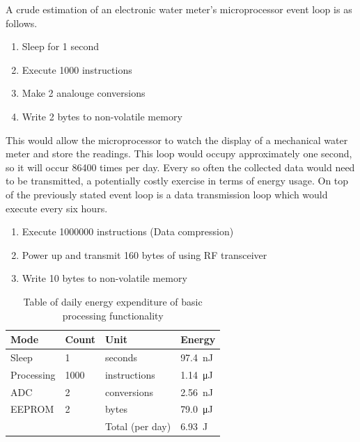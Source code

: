     A crude estimation of an electronic water meter's microprocessor event loop is as follows.
    \begin{enumerate}
      \item Sleep for 1 second
      \item Execute 1000 instructions
      \item Make 2 analouge conversions
      \item Write 2 bytes to non-volatile memory
    \end{enumerate}
    This would allow the microprocessor to watch the display of a mechanical water meter and store the readings.
    This loop would occupy approximately one second, so it will occur 86400 times per day.
    Every so often the collected data would need to be transmitted, a potentially costly exercise in terms of energy usage.
    On top of the previously stated event loop is a data transmission loop which would execute every six hours.
    \begin{enumerate}
      \item Execute 1000000 instructions (Data compression)
      \item Power up and transmit 160 bytes of using RF transceiver
      \item Write 10 bytes to non-volatile memory
    \end{enumerate}

    \begin{table}
      \centering
      \begin{tabular}{|l|l|l|l|}
        \hline
        Mode & Count & Unit & Energy \\ \hline
        Sleep & 1 & seconds & \SI{97.4}{\nano\joule} \\
        Processing & 1000 & instructions & \SI{1.14}{\micro\joule} \\
        ADC & 2 & conversions & \SI{2.56}{\nano\joule} \\
        EEPROM & 2 & bytes & \SI{79.0}{\micro\joule} \\ \hline \hline
        &&Total (per day) & \SI{6.93}{\joule} \\ \hline
      \end{tabular}
      \caption{\label{tab:EnergyBudget-EventLoop}Table of daily energy expenditure of basic processing functionality}
    \end{table}

